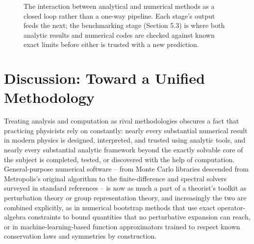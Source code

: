 \begin{figure}[h]
\centering
{}
\caption{The interaction between analytical and numerical methods as a closed loop rather than a one-way pipeline. Each stage's output feeds the next; the benchmarking stage (Section 5.3) is where both analytic results and numerical codes are checked against known exact limits before either is trusted with a new prediction.}
\label{fig:loop}
\end{figure}

\section{Discussion: Toward a Unified Methodology}

Treating analysis and computation as rival methodologies obscures a fact that
practicing physicists rely on constantly: nearly every substantial numerical
result in modern physics is designed, interpreted, and trusted using analytic
tools, and nearly every substantial analytic framework beyond the exactly
solvable core of the subject is completed, tested, or discovered with the help
of computation. General-purpose numerical software -- from Monte Carlo
libraries descended from Metropolis's original algorithm to the
finite-difference and spectral solvers surveyed in standard references
\cite{PressNumericalRecipes2007} -- is now as much a part of a theorist's
toolkit as perturbation theory or group representation theory, and increasingly
the two are combined explicitly, as in numerical bootstrap methods that use
exact operator-algebra constraints to bound quantities that no perturbative
expansion can reach, or in machine-learning-based function approximators
trained to respect known conservation laws and symmetries by construction.

